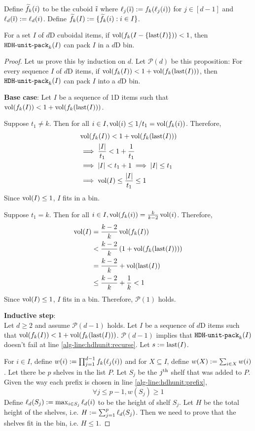Define $\widetilde{f}_{k}(i)$ to be the cuboid $\tilde{\imath}$ where $\ell_j(\tilde{\imath}) := f_k(\ell_j(i))$
for $j \in [d-1]$ and $\ell_d(\tilde{\imath}) := \ell_d(i)$.
Define $\widetilde{f}_{k}(I) := \{\widetilde{f}_{k}(i): i \in I\}$.

\begin{theorem}[Correctness]
\label{thm:hdhkunit}
For a set $I$ of $d$D cuboidal items, if $\operatorname{vol}(f_k(I-\{\operatorname{last}(I)\})) < 1$,
then $\operatorname{\mathtt{HDH-unit-pack}}_k(I)$ can pack $I$ in a $d$D bin.
\end{theorem}
\begin{proof}
Let us prove this by induction on $d$.
Let $\mathcal{P}(d)$ be this proposition:
For every sequence $I$ of $d$D items, if $\operatorname{vol}(f_k(I)) < 1 + \operatorname{vol}(f_k(\operatorname{last}(I)))$,
then $\operatorname{\mathtt{HDH-unit-pack}}_k(I)$ can pack $I$ into a $d$D bin.

\textbf{Base case}:
Let $I$ be a sequence of 1D items such that $\operatorname{vol}(f_k(I)) < 1 + \operatorname{vol}(f_k(\operatorname{last}(I)))$.

Suppose $t_1 \neq k$.
Then for all $i \in I, \operatorname{vol}(i) \le 1/t_1 = \operatorname{vol}(f_k(i))$. Therefore,
\begin{align*}
& \operatorname{vol}(f_k(I)) < 1 + \operatorname{vol}(f_k(\operatorname{last}(I)))
\\ &\implies \frac{|I|}{t_1} < 1 + \frac{1}{t_1}
\\ &\implies |I| < t_1 + 1 \implies |I| \le t_1
\\ &\implies \operatorname{vol}(I) \le \frac{|I|}{t_1} \le 1
\end{align*}
Since $\operatorname{vol}(I) \le 1$, $I$ fits in a bin.

Suppose $t_1 = k$.
Then for all $i \in I, \operatorname{vol}(f_k(i)) = \frac{k}{k-2}\operatorname{vol}(i)$. Therefore,
\begin{align*}
\operatorname{vol}(I) &= \frac{k-2}{k}\operatorname{vol}(f_k(I))
\\ &< \frac{k-2}{k}\left( 1 + \operatorname{vol}(f_k(\operatorname{last}(I)))\right)
\\ &= \frac{k-2}{k} + \operatorname{vol}(\operatorname{last}(I))
\\ &\le \frac{k-2}{k} + \frac{1}{k} < 1
\end{align*}
Since $\operatorname{vol}(I) \le 1$, $I$ fits in a bin.
Therefore, $\mathcal{P}(1)$ holds.

\textbf{Inductive step}:\\
Let $d \ge 2$ and assume $\mathcal{P}(d-1)$ holds.
Let $I$ be a sequence of $d$D items such that $\operatorname{vol}(f_k(I)) < 1 + \operatorname{vol}(f_k(\operatorname{last}(I)))$.
$\mathcal{P}(d-1)$ implies that $\operatorname{\mathtt{HDH-unit-pack}}_k(I)$ doesn't fail at
line \ref{alg-line:hdhunit:recurse}.
Let $s := \operatorname{last}(I)$.

For $i \in I$, define $w(i) := \prod_{j=1}^{d-1} f_k(\ell_j(i))$
and for $X \subseteq I$, define $w(X) := \sum_{i \in X} w(i)$.
Let there be $p$ shelves in the list $P$.
Let $S_j$ be the $j^{\textrm{th}}$ shelf that was added to $P$.
Given the way each prefix is chosen in line \ref{alg-line:hdhunit:prefix},
\begin{equation}\label{eqn:hdhunit:shelf-wide}
\forall j \le p-1, w(S_j) \ge 1 \end{equation}
Define $\ell_d(S_j) := \max_{i \in S_j} \ell_d(i)$ to be the height of shelf $S_j$.
Let $H$ be the total height of the shelves, i.e. $H := \sum_{j=1}^p \ell_d(S_j)$.
Then we need to prove that the shelves fit in the bin, i.e. $H \le 1$.


\end{proof}
